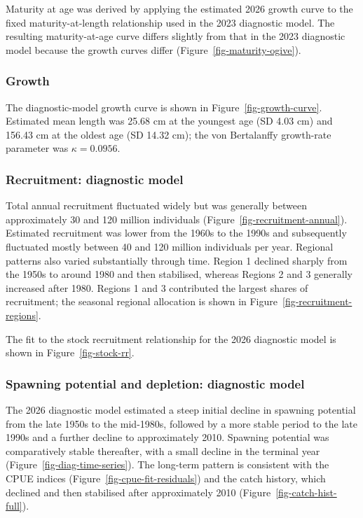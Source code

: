 \documentclass[
  english,
  a4paper,
  a4paper,
  11pt]{SCreport}
\begin{document}
Maturity at age was derived by applying the estimated 2026 growth curve
to the fixed maturity-at-length relationship used in the 2023 diagnostic
model. The resulting maturity-at-age curve differs slightly from that in
the 2023 diagnostic model because the growth curves differ
(Figure~\ref{fig-maturity-ogive}).

\subsubsection{Growth}\label{sec-growth-param}

The diagnostic-model growth curve is shown in
Figure~\ref{fig-growth-curve}. Estimated mean length was 25.68 cm at the
youngest age (SD 4.03 cm) and 156.43 cm at the oldest age (SD 14.32 cm);
the von Bertalanffy growth-rate parameter was \(\kappa=0.0956\).

\subsubsection{Recruitment: diagnostic
model}\label{sec-recruitment-diag}

Total annual recruitment fluctuated widely but was generally between
approximately 30 and 120 million individuals
(Figure~\ref{fig-recruitment-annual}). Estimated recruitment was lower
from the 1960s to the 1990s and subsequently fluctuated mostly between
40 and 120 million individuals per year. Regional patterns also varied
substantially through time. Region 1 declined sharply from the 1950s to
around 1980 and then stabilised, whereas Regions 2 and 3 generally
increased after 1980. Regions 1 and 3 contributed the largest shares of
recruitment; the seasonal regional allocation is shown in
Figure~\ref{fig-recruitment-regions}.

The fit to the stock recruitment relationship for the 2026 diagnostic
model is shown in Figure~\ref{fig-stock-rr}.

\subsubsection{Spawning potential and depletion: diagnostic
model}\label{sec-biomass-diag}

The 2026 diagnostic model estimated a steep initial decline in spawning
potential from the late 1950s to the mid-1980s, followed by a more
stable period to the late 1990s and a further decline to approximately
2010. Spawning potential was comparatively stable thereafter, with a
small decline in the terminal year (Figure~\ref{fig-diag-time-series}).
The long-term pattern is consistent with the CPUE indices
(Figure~\ref{fig-cpue-fit-residuals}) and the catch history, which
declined and then stabilised after approximately 2010
(Figure~\ref{fig-catch-hist-full}).
\end{document}
